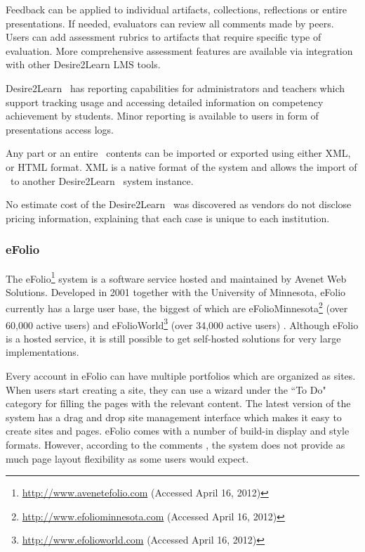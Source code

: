 Feedback can be applied to individual artifacts, collections, reflections or
entire presentations. If needed, evaluators can review all comments made by
peers. Users can add assessment rubrics to artifacts that require specific
type of evaluation. More comprehensive assessment features are available via
integration with other Desire2Learn LMS tools. 

Desire2Learn \ep~has reporting capabilities for administrators and teachers
which support tracking usage and accessing detailed information on competency
achievement by students. Minor reporting is available to users in form of
presentations access logs.

Any part or an entire \ep~contents can be imported or exported using either XML,
or HTML format. XML is a native format of the system and allows the import of
\ep~to another Desire2Learn \ep~system instance.

No estimate cost of the Desire2Learn \ep~was discovered as vendors do not
disclose pricing information, explaining that each case is unique to each
institution.
 
\subsubsection{eFolio}

The eFolio\footnote{\url{http://www.avenetefolio.com} (Accessed April 16, 2012)}
system is a software service hosted and maintained by Avenet Web Solutions. Developed in 2001
together with the University of Minnesota, eFolio currently has a large user
base, the biggest of which are
eFolioMinnesota\footnote{\url{http://www.efoliominnesota.com} (Accessed April
16, 2012)} (over 60,000 active users) and
eFolioWorld\footnote{\url{http://www.efolioworld.com} (Accessed April 16, 2012)} (over 34,000 active users) \citep{AAEEBL2011}. Although eFolio is a hosted service, it
is still possible to get self-hosted solutions for very large implementations.

Every account in eFolio can have multiple portfolios which are organized as
sites. When users start creating a site, they can use a wizard under the ``To
Do" category for filling the pages with the relevant content. The latest version
of the system has a drag and drop site management interface which makes it easy to
create sites and pages. eFolio comes with a number of build-in display and style
formats. However, according to the comments \citep{AAEEBL2011}, the system
does not provide as much page layout flexibility as some users would expect.

